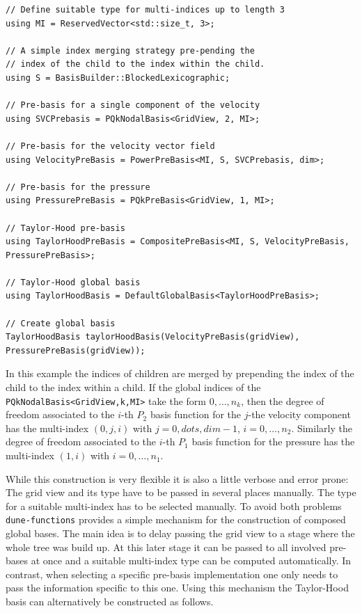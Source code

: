 \documentclass[a4paper,10pt,headings=normal,bibliography=totoc]{scrartcl}
\newcommand{\cpp}[1]{\lstinline[basicstyle=\ttfamily]!#1!}
\newcommand{\dunemodule}[1]{\texttt{#1}}
\begin{document}
\begin{lstlisting}[style=Example]
// Define suitable type for multi-indices up to length 3
using MI = ReservedVector<std::size_t, 3>;

// A simple index merging strategy pre-pending the
// index of the child to the index within the child.
using S = BasisBuilder::BlockedLexicographic;

// Pre-basis for a single component of the velocity
using SVCPrebasis = PQkNodalBasis<GridView, 2, MI>;

// Pre-basis for the velocity vector field
using VelocityPreBasis = PowerPreBasis<MI, S, SVCPrebasis, dim>;

// Pre-basis for the pressure
using PressurePreBasis = PQkPreBasis<GridView, 1, MI>;

// Taylor-Hood pre-basis
using TaylorHoodPreBasis = CompositePreBasis<MI, S, VelocityPreBasis, PressurePreBasis>;

// Taylor-Hood global basis
using TaylorHoodBasis = DefaultGlobalBasis<TaylorHoodPreBasis>;

// Create global basis
TaylorHoodBasis taylorHoodBasis(VelocityPreBasis(gridView), PressurePreBasis(gridView));
\end{lstlisting}

In this example the indices of children are merged by prepending
the index of the child to the index within a child. If the global
indices of the \cpp{PQkNodalBasis<GridView,k,MI>} take the form
$0,\dots,n_k$, then the degree of freedom associated to the
$i$-th $P_2$ basis function for the $j$-the velocity component
has the multi-index $(0,j,i)$ with $j=0,dots,dim-1$, $i=0,\dots,n_2$.
Similarly the degree of freedom associated to the $i$-th $P_1$
basis function for the pressure has the multi-index $(1,i)$
with $i=0,\dots,n_1$.

While this construction is very flexible it is also a little
verbose and error prone: The grid view and its type have to
be passed in several places manually. The type for a suitable
multi-index has to be selected manually. To avoid both problems
\dunemodule{dune-functions} provides a simple mechanism for
the construction of composed global bases. The main idea is
to delay passing the grid view to a stage where the whole tree
was build up. At this later stage it can be passed to all
involved pre-bases at once and a suitable multi-index type
can be computed automatically. In contrast, when selecting
a specific pre-basis implementation one only needs to pass
the information specific to this one.
Using this mechanism the Taylor-Hood basis can alternatively
be constructed as follows.
\end{document}
